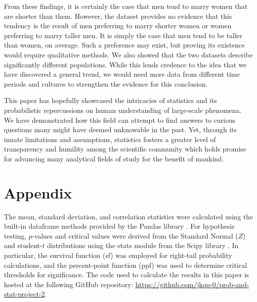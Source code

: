 \documentclass{article}
\begin{document}
From these findings, it is certainly the case that men tend to marry women that are shorter than them.
However, the dataset provides no evidence that this tendency is the result of men preferring to marry shorter women or women preferring to marry taller men.
It is simply the case that men tend to be taller than women, on average.
Such a preference may exist, but proving its existence would require qualitative methods.
We also showed that the two datasets describe significantly different populations.
While this lends credence to the idea that we have discovered a general trend, we would need more data from different time periods and cultures to strengthen the evidence for this conclusion.

This paper has hopefully showcased the intricacies of statistics and its probabilistic repercussions on human understanding of large-scale phenomena.
We have demonstrated how this field can attempt to find answers to curious questions many might have deemed unknowable in the past.
Yet, through its innate limitations and assumptions, statistics fosters a greater level of transparency and humility among the scientific community which holds promise for advancing many analytical fields of study for the benefit of mankind.

\section{Appendix}\label{sec:appendix}

The mean, standard deviation, and correlation statistics were calculated using the built-in dataframe methods provided by the Pandas library \parencite{pandas}.
For hypothesis testing, $p$-values and critical values were derived from the Standard Normal ($Z$) and student-$t$ distributions using the stats module from the Scipy library \parencite{scipy}.
In particular, the survival function (sf) was employed for right-tail probability calculations, and the percent-point function (ppf) was used to determine critical thresholds for significance.
The code used to calculate the results in this paper is hosted at the following GitHub repository: \url{https://github.com/jkqq-0/prob-and-stat-project-2}.

\printbibliography
\end{document}
